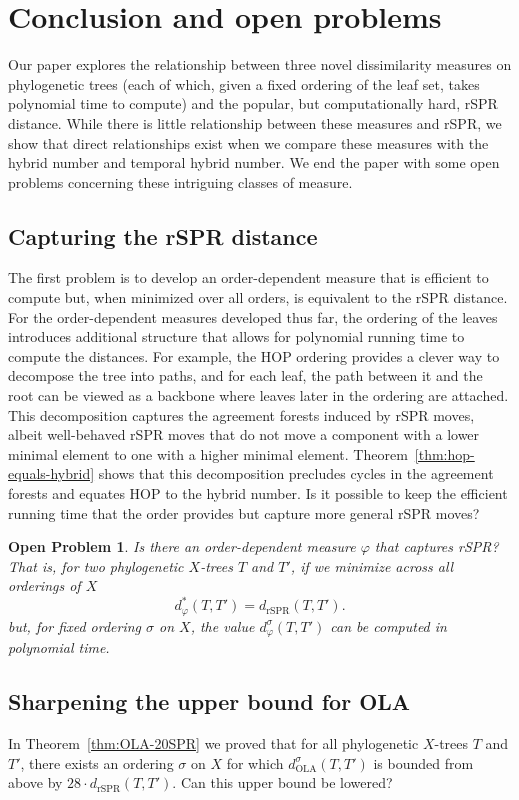 \documentclass{article}
\newtheorem{problem}{Open Problem}
\newcommand{\rSPR}{\mathrm{rSPR}}
\newcommand{\OLA}{\mathrm{OLA}}
\begin{document}
\section{Conclusion and open problems}
\label{openProblems}

Our paper explores the relationship between three novel dissimilarity measures on phylogenetic trees (each of which, given a fixed ordering of the leaf set, takes polynomial time to compute) and the popular, but computationally hard, rSPR distance.  While there is little relationship between these measures and rSPR, we show that direct relationships exist when we compare these measures with the hybrid number and temporal hybrid number. We end the paper with some open problems concerning these intriguing classes of measure.

\subsection*{Capturing the rSPR distance}
The first problem is to develop an order-dependent measure that is efficient to compute but, when minimized over all orders, is equivalent to the rSPR distance. For the order-dependent measures developed thus far, the ordering of the leaves introduces additional structure that allows for polynomial running time to compute the distances.  For example, the HOP ordering provides a clever way to decompose the tree into paths, and for each leaf, the path between it and the root can be viewed as a backbone where leaves later in the ordering are attached. This decomposition captures the agreement forests induced by rSPR moves, albeit well-behaved rSPR moves that do not move a component with a lower minimal element to one with a higher minimal element.  Theorem~\ref{thm:hop-equals-hybrid} shows that this decomposition precludes cycles in the agreement forests and equates HOP to the hybrid number.  Is it possible to keep the efficient running time that the order provides but capture more general rSPR moves?

\begin{problem}  Is there an order-dependent measure $\varphi$ that captures rSPR? That is, for two phylogenetic $X$-trees $T$ and $T'$, if we minimize across all orderings of $X$
$$
d_{\varphi}^*(T,T') = d_\rSPR(T,T').
$$
but, for fixed ordering $\sigma$ on $X$, the value $d^\sigma_{\varphi}(T, T')$ can be computed in polynomial time.
\end{problem}


\subsection*{Sharpening the upper bound for OLA}  
In Theorem~\ref{thm:OLA-20SPR} we proved that for all phylogenetic $X$-trees $T$ and $T'$, there exists an ordering $\sigma$ on $X$ for which $d^\sigma_\OLA(T,T')$ is bounded from above by $28 \cdot d_\rSPR(T,T')$.
Can this upper bound be lowered?  
\end{document}
